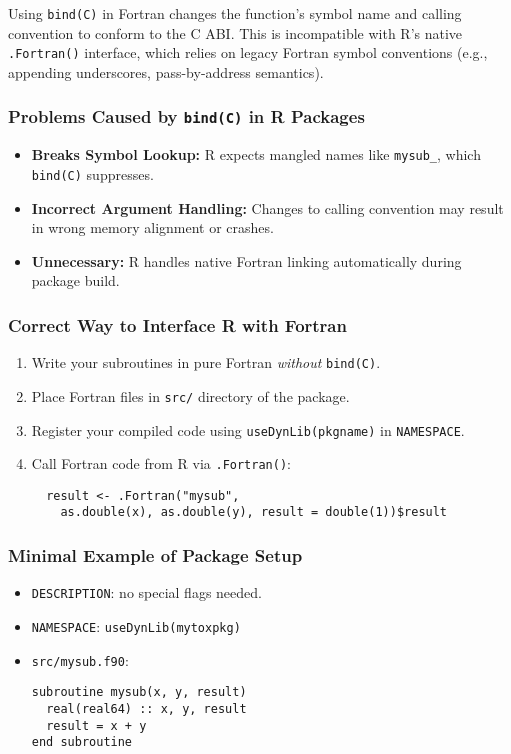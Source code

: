\documentclass{article}
\begin{document}
Using \texttt{bind(C)} in Fortran changes the function's symbol name and calling convention to conform to the C ABI. This is incompatible with R's native \texttt{.Fortran()} interface, which relies on legacy Fortran symbol conventions (e.g., appending underscores, pass-by-address semantics).

\subsubsection*{Problems Caused by \texttt{bind(C)} in R Packages}
\begin{itemize}
  \item \textbf{Breaks Symbol Lookup:} R expects mangled names like \texttt{mysub\_}, which \texttt{bind(C)} suppresses.
  \item \textbf{Incorrect Argument Handling:} Changes to calling convention may result in wrong memory alignment or crashes.
  \item \textbf{Unnecessary:} R handles native Fortran linking automatically during package build.
\end{itemize}

\subsubsection*{Correct Way to Interface R with Fortran}
\begin{enumerate}
  \item Write your subroutines in pure Fortran \emph{without} \texttt{bind(C)}.
  \item Place Fortran files in \texttt{src/} directory of the package.
  \item Register your compiled code using \texttt{useDynLib(pkgname)} in \texttt{NAMESPACE}.
  \item Call Fortran code from R via \texttt{.Fortran()}:
\begin{verbatim}
  result <- .Fortran("mysub",
    as.double(x), as.double(y), result = double(1))$result
\end{verbatim}
\end{enumerate}

\subsubsection*{Minimal Example of Package Setup}
\begin{itemize}
  \item \texttt{DESCRIPTION}: no special flags needed.
  \item \texttt{NAMESPACE}: \verb|useDynLib(mytoxpkg)|
  \item \texttt{src/mysub.f90}:
\begin{verbatim}
subroutine mysub(x, y, result)
  real(real64) :: x, y, result
  result = x + y
end subroutine
\end{verbatim}
\end{itemize}
\end{document}
